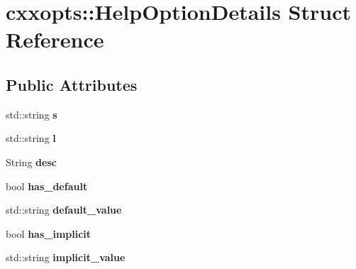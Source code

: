 \hypertarget{structcxxopts_1_1HelpOptionDetails}{}\section{cxxopts\+:\+:Help\+Option\+Details Struct Reference}
\label{structcxxopts_1_1HelpOptionDetails}
\subsection*{Public Attributes}
\begin{DoxyCompactItemize}
\item 
std\+::string {\bfseries s}\hypertarget{structcxxopts_1_1HelpOptionDetails_a83cb4bc76deb1d40c89de4165e4b0cdc}{}\label{structcxxopts_1_1HelpOptionDetails_a83cb4bc76deb1d40c89de4165e4b0cdc}

\item 
std\+::string {\bfseries l}\hypertarget{structcxxopts_1_1HelpOptionDetails_a19a4fe10f8a5b47ec8e2134bea26aabe}{}\label{structcxxopts_1_1HelpOptionDetails_a19a4fe10f8a5b47ec8e2134bea26aabe}

\item 
String {\bfseries desc}\hypertarget{structcxxopts_1_1HelpOptionDetails_a7c83455289612b05713b87154877caec}{}\label{structcxxopts_1_1HelpOptionDetails_a7c83455289612b05713b87154877caec}

\item 
bool {\bfseries has\+\_\+default}\hypertarget{structcxxopts_1_1HelpOptionDetails_ac869dd2ac03fc090f34bce1907f5edd5}{}\label{structcxxopts_1_1HelpOptionDetails_ac869dd2ac03fc090f34bce1907f5edd5}

\item 
std\+::string {\bfseries default\+\_\+value}\hypertarget{structcxxopts_1_1HelpOptionDetails_aa59a81e78fb7e785dd8b61ab21233db8}{}\label{structcxxopts_1_1HelpOptionDetails_aa59a81e78fb7e785dd8b61ab21233db8}

\item 
bool {\bfseries has\+\_\+implicit}\hypertarget{structcxxopts_1_1HelpOptionDetails_ad9ddbdca27930394f32b51f7bf3b1748}{}\label{structcxxopts_1_1HelpOptionDetails_ad9ddbdca27930394f32b51f7bf3b1748}

\item 
std\+::string {\bfseries implicit\+\_\+value}\hypertarget{structcxxopts_1_1HelpOptionDetails_a21114f51515edf454e214f3c881ae212}{}\label{structcxxopts_1_1HelpOptionDetails_a21114f51515edf454e214f3c881ae212}


\end{DoxyCompactItemize}
